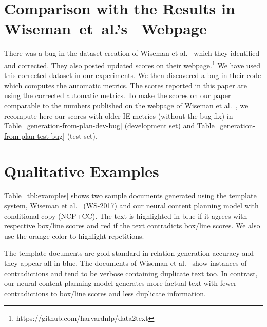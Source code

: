 \documentclass[letterpaper]{article} \usepackage{aaai19}  \usepackage{times}  \usepackage{helvet}  \usepackage{courier}  \usepackage{url}  \usepackage{graphicx}  \frenchspacing  \setlength{\pdfpagewidth}{8.5in}  \setlength{\pdfpageheight}{11in}  \graphicspath{ {images/} }
\begin{document}
\section*{Comparison with the Results in Wiseman~et~al.'s~ Webpage}
\label{sec:supplemental}
There was a bug in the dataset creation of Wiseman et
al.~ which they identified and
corrected. They also posted updated scores on their
webpage.\footnote{https://github.com/harvardnlp/data2text} We have
used this corrected dataset in our experiments. We then discovered a
bug in their code which computes the automatic metrics. The scores
reported in this paper are using the corrected automatic metrics. To
make the scores on our paper comparable to the numbers published on
the webpage of Wiseman et al.~, 
we recompute here our
scores with older IE metrics (without the bug fix) in
Table~\ref{generation-from-plan-dev-bug} (development set) and
Table~\ref{generation-from-plan-test-bug} (test set).

\section*{Qualitative Examples}
Table~\ref{tbl:examples} shows two sample documents generated using
the template system, Wiseman et al.~ (WS-2017) and our
neural content planning model with conditional copy (NCP+CC). The text
is highlighted in blue if it agrees with respective box/line scores
and red if the text contradicts box/line scores. We also use the
orange color to highlight repetitions.

The template documents are gold standard in relation generation
accuracy and they appear all in blue. The documents of
Wiseman et al.~ show instances of contradictions and
tend to be verbose containing duplicate text too. In contrast, our
neural content planning model generates more factual text with fewer
contradictions to box/line scores and less duplicate information.
\end{document}
